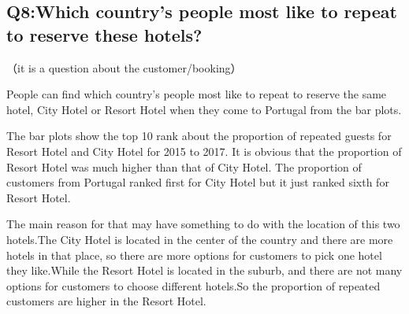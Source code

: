 \documentclass[11pt,a4paper,]{article}
\begin{document}
\hypertarget{q8which-countrys-people-most-like-to-repeat-to-reserve-these-hotels}{%
\subsection{Q8:Which country's people most like to repeat to reserve these hotels?}\label{q8which-countrys-people-most-like-to-repeat-to-reserve-these-hotels}}

（it is a question about the customer/booking）

People can find which country's people most like to repeat to reserve the same hotel, City Hotel or Resort Hotel when they come to Portugal from the bar plots.

The bar plots show the top 10 rank about the proportion of repeated guests for Resort Hotel and City Hotel for 2015 to 2017. It is obvious that the proportion of Resort Hotel was much higher than that of City Hotel. The proportion of customers from Portugal ranked first for City Hotel but it just ranked sixth for Resort Hotel.

The main reason for that may have something to do with the location of this two hotels.The City Hotel is located in the center of the country and there are more hotels in that place, so there are more options for customers to pick one hotel they like.While the Resort Hotel is located in the suburb, and there are not many options for customers to choose different hotels.So the proportion of repeated customers are higher in the Resort Hotel.
\end{document}
